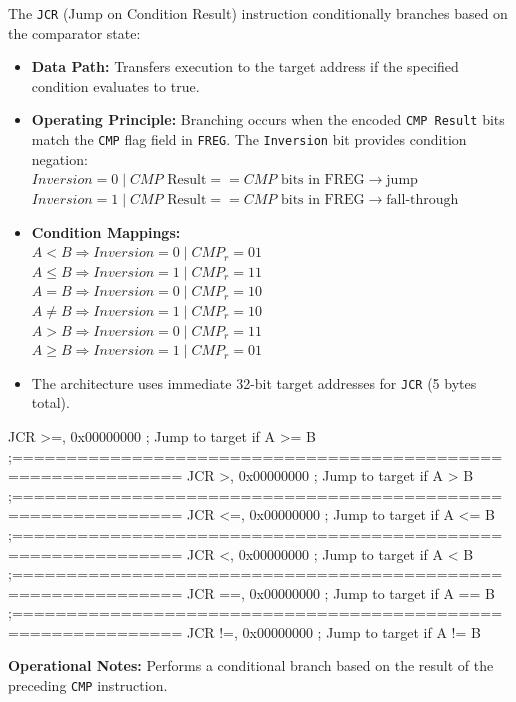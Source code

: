 \documentclass[11pt,a4paper]{article}
\begin{document}
\begin{instructiondesc}[title={Detailed Description and Microcode Semantics}]
The \texttt{JCR} (Jump on Condition Result) instruction conditionally branches based on the comparator state:
\begin{itemize}
    \item \textbf{Data Path:} Transfers execution to the target address if the specified condition evaluates to true.
    \item \textbf{Operating Principle:} Branching occurs when the encoded \texttt{CMP Result} bits match the \texttt{CMP} flag field in \texttt{FREG}. The \texttt{Inversion} bit provides condition negation: \\
    \( Inversion = 0 \mid CMP\text{ Result} == CMP\text{ bits in FREG} \longrightarrow \text{jump} \) \\
    \( Inversion = 1 \mid CMP\text{ Result} == CMP\text{ bits in FREG} \longrightarrow \text{fall-through} \)
    \item \textbf{Condition Mappings:} \\
    \( A < B \Longrightarrow Inversion = 0 \mid CMP_r = 01 \) \\
    \( A \leqslant B \Longrightarrow Inversion = 1 \mid CMP_r = 11 \) \\
    \( A = B \Longrightarrow Inversion = 0 \mid CMP_r = 10 \) \\
    \( A \neq B \Longrightarrow Inversion = 1 \mid CMP_r = 10 \) \\
    \( A > B \Longrightarrow Inversion = 0 \mid CMP_r = 11 \) \\
    \( A \geqslant B \Longrightarrow Inversion = 1 \mid CMP_r = 01 \)
    \item The architecture uses immediate 32-bit target addresses for \texttt{JCR} (5 bytes total).
\end{itemize}
\end{instructiondesc}

\begin{examplebox}[title={Usage Example (LIM2 Assembly)}]
\begin{limasm}
JCR >=, 0x00000000      ; Jump to target if A >= B
;=============================================================
JCR >,  0x00000000      ; Jump to target if A >  B
;=============================================================
JCR <=, 0x00000000      ; Jump to target if A <= B
;=============================================================
JCR <,  0x00000000      ; Jump to target if A <  B
;=============================================================
JCR ==, 0x00000000      ; Jump to target if A == B
;=============================================================
JCR !=, 0x00000000      ; Jump to target if A != B
\end{limasm}
\vspace{1.5mm}
\footnotesize\color{limmuted}
\textbf{Operational Notes:} Performs a conditional branch based on the result of the preceding \texttt{CMP} instruction.
\end{examplebox}
\end{document}

